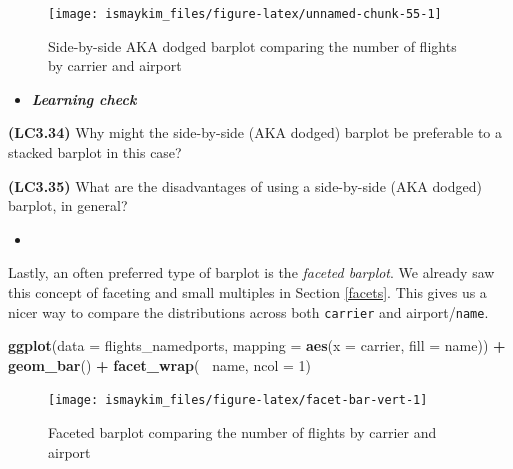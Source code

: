 \documentclass[12pt,]{krantz}
\makeatletter
\newenvironment{Shaded}{\begin{snugshade}}{\end{snugshade}}
\newcommand{\KeywordTok}[1]{\textcolor[rgb]{0.27,0.27,0.27}{\textbf{#1}}}
\newcommand{\DataTypeTok}[1]{\textcolor[rgb]{0.27,0.27,0.27}{#1}}
\newcommand{\DecValTok}[1]{\textcolor[rgb]{0.06,0.06,0.06}{#1}}
\newcommand{\StringTok}[1]{\textcolor[rgb]{0.5,0.5,0.5}{#1}}
\newcommand{\OperatorTok}[1]{\textcolor[rgb]{0.43,0.43,0.43}{\textbf{#1}}}
\newcommand{\NormalTok}[1]{#1}
\newenvironment{kframe}{%
\medskip{}
\setlength{\fboxsep}{.8em}
 \def\at@end@of@kframe{}%
 \ifinner\ifhmode%
  \def\at@end@of@kframe{\end{minipage}}%
  \begin{minipage}{\columnwidth}%
 \fi\fi%
 \def\FrameCommand##1{\hskip\@totalleftmargin \hskip-\fboxsep
 \colorbox{shadecolor}{##1}\hskip-\fboxsep
     \hskip-\linewidth \hskip-\@totalleftmargin \hskip\columnwidth}%
 \MakeFramed {\advance\hsize-\width
   \@totalleftmargin\z@ \linewidth\hsize
   \@setminipage}}%
 {\par\unskip\endMakeFramed%
 \at@end@of@kframe}
\renewenvironment{Shaded}{\begin{kframe}}{\end{kframe}}
\newenvironment{rmdblock}[1]
  {\begin{shaded*}
  \begin{itemize}
  \renewcommand{\labelitemi}{
    \raisebox{-.7\height}[0pt][0pt]{
    }
  }
  \item
  }
  {
  \end{itemize}
  \end{shaded*}
  }
\newenvironment{learncheck}
  {\begin{rmdblock}{warning}}
  {\end{rmdblock}}
\makeatother
\begin{document}
\begin{figure}

{\centering \texttt{[image: ismaykim\_files/figure-latex/unnamed-chunk-55-1]} 

}

\caption{Side-by-side AKA dodged barplot comparing the number of flights by carrier and airport}\label{fig:unnamed-chunk-55}
\end{figure}

\begin{learncheck}
\textbf{\emph{Learning check}}
\end{learncheck}

\textbf{(LC3.34)} Why might the side-by-side (AKA dodged) barplot be
preferable to a stacked barplot in this case?

\textbf{(LC3.35)} What are the disadvantages of using a side-by-side
(AKA dodged) barplot, in general?

\begin{learncheck}

\end{learncheck}

Lastly, an often preferred type of barplot is the \emph{faceted
barplot}. We already saw this concept of faceting and small multiples in
Section \ref{facets}. This gives us a nicer way to compare the
distributions across both \texttt{carrier} and airport/\texttt{name}.

\begin{Shaded}
\begin{Highlighting}[]
\KeywordTok{ggplot}\NormalTok{(}\DataTypeTok{data =}\NormalTok{ flights_namedports, }
       \DataTypeTok{mapping =} \KeywordTok{aes}\NormalTok{(}\DataTypeTok{x =}\NormalTok{ carrier, }\DataTypeTok{fill =}\NormalTok{ name)) }\OperatorTok{+}
\StringTok{  }\KeywordTok{geom_bar}\NormalTok{() }\OperatorTok{+}
\StringTok{  }\KeywordTok{facet_wrap}\NormalTok{(}\OperatorTok{~}\StringTok{ }\NormalTok{name, }\DataTypeTok{ncol =} \DecValTok{1}\NormalTok{)}
\end{Highlighting}
\end{Shaded}

\begin{figure}

{\centering \texttt{[image: ismaykim\_files/figure-latex/facet-bar-vert-1]} 

}

\caption{Faceted barplot comparing the number of flights by carrier and airport}\label{fig:facet-bar-vert}
\end{figure}
\end{document}
